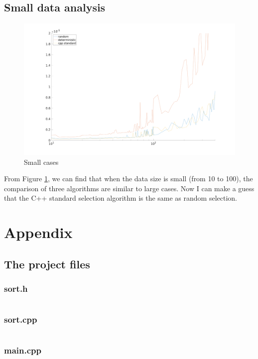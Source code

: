 \documentclass{article}
\begin{document}
\subsection{Small data analysis}

\begin{figure}[!htbp]
\centering
\includegraphics[width=0.8\linewidth]{../benchmark/fig2.png}
\caption{Small cases}
\label{fig-2}
\end{figure}

From Figure \ref{fig-2}, we can find that when the data size is small (from 10 to 100), the comparison of three algorithms are similar to large cases. Now  I can make a guess that the C++ standard selection algorithm is the same as random selection.

\newpage

\section{Appendix}

\subsection{The project files}

\subsubsection{sort.h}
\inputminted{c++}{../answer/selection.h}
\subsubsection{sort.cpp}
\inputminted{c++}{../answer/selection.cpp}
\subsubsection{main.cpp}
\inputminted{c++}{../answer/main.cpp}
\end{document}
